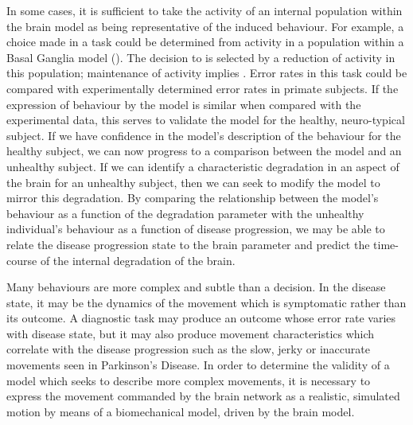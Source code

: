 \documentclass{frontiersSCNS}
\begin{document}
In some cases, it is sufficient to take the activity of an internal
population within the brain model as being representative of the
induced behaviour. For example, a choice made in a  task
could be determined from activity in a population within a Basal
Ganglia model
(\cite{nambu_discharge_1990,kuhn_event-related_2004}). The decision
to  is selected by a reduction of activity in this population;
maintenance of activity implies . Error rates in this task
could be compared with experimentally determined error rates in
primate subjects.
If the expression of behaviour by the model is similar when compared
with the experimental data, this serves to validate the model for the
healthy, neuro-typical subject.
If we have confidence in the model's description of the behaviour for
the healthy subject, we can now progress to a comparison between the
model and an unhealthy subject. If we can identify a characteristic
degradation in an aspect of the brain for an unhealthy subject, then
we can seek to modify the model to mirror this degradation. By
comparing the relationship between the model's behaviour as a function
of the degradation parameter with the unhealthy individual's behaviour
as a function of disease progression, we may be able to relate the
disease progression state to the brain parameter and predict the
time-course of the internal degradation of the brain.

Many behaviours are more complex and subtle than a decision. In the
disease state, it may be the dynamics of the movement which is
symptomatic rather than its outcome. A diagnostic task may produce an
outcome whose error rate varies with disease state, but it may also
produce movement characteristics which correlate with the disease
progression such as the slow, jerky or inaccurate movements seen in
Parkinson's Disease. In order to determine the validity of a model
which seeks to describe more complex movements, it is necessary to
express the movement commanded by the brain network as a realistic,
simulated motion by means of a biomechanical model, driven by the
brain model.
\end{document}
